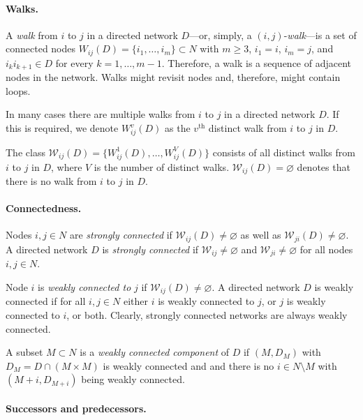 \documentclass[11pt,fleqn]{article}
\begin{document}
\paragraph{Walks.}

A \textit{walk} from $i$ to $j$ in a directed network $D$---or, simply, a $(i,j)$-\emph{walk}---is a set of connected nodes $W_{ij} (D) = \{ i_{1}, \ldots ,i_{m} \} \subset N$ with $m \geqslant 3$, $i_1 =i$, $i_m =j$, and $i_{k}i_{k+1} \in D$ for every $k=1, \ldots ,m-1$. Therefore, a walk is a sequence of adjacent nodes in the network. Walks might revisit nodes and, therefore, might contain loops.

In many cases there are multiple walks from $i$ to $j$ in a directed network $D$. If this is required, we denote $W_{ij}^{v}(D)$ as the $v^{\mbox{th}}$ distinct walk from $i$ to $j$ in $D$.

The class $\mathcal{W}_{ij}(D)= \{ W_{ij}^{1}(D), \ldots ,W_{ij}^{V}(D) \}$ consists of all distinct walks from $i$ to $j$ in $D$, where $V$ is the number of distinct walks. $\mathcal{W}_{ij}(D)= \varnothing$ denotes that there is no walk from $i$ to $j$ in $D$.

\paragraph{Connectedness.}

Nodes $i,j \in N$ are \textit{strongly connected} if $\mathcal{W}_{ij}(D) \neq \varnothing$ as well as $\mathcal{W}_{ji}(D) \neq \varnothing$. A directed network $D$ is \emph{strongly connected} if $\mathcal{W}_{ij} \neq \varnothing$ and $\mathcal{W}_{ji} \neq \varnothing$ for all nodes $i,j \in N$.

Node $i$ is \textit{weakly connected to} $j$ if $\mathcal{W}_{ij}(D) \neq \varnothing$. A directed network $D$ is weakly connected if for all $i,j \in N$ either $i$ is weakly connected to $j$, or $j$ is weakly connected to $i$, or both. Clearly, strongly connected networks are always weakly connected.

A subset $M \subset N$ is a \emph{weakly connected component} of $D$ if $(M, D_M)$ with $D_M = D \cap (M \times M)$ is weakly connected and and there is no $i \in N \setminus M$ with $(M+i, D_{M+i})$ being weakly connected.

\paragraph{Successors and predecessors.}
\end{document}
